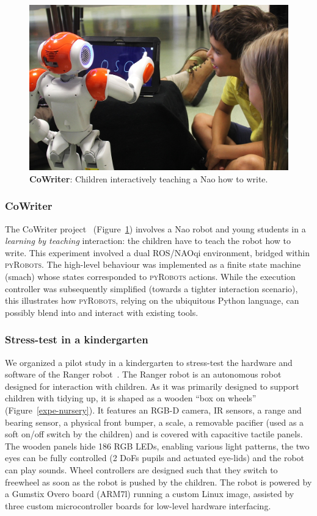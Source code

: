 \documentclass[letterpaper, 10pt, conference]{ieeeconf}      %
\newcommand{\pyRobots}{\textsc{pyRobots}}
\begin{document}
\begin{figure}
        \centering
        \includegraphics[width=0.9\columnwidth]{cowriter}
        \caption{\textbf{CoWriter}: Children interactively teaching a Nao how to
        write.}
        \label{expe-cowriter}
\end{figure}

\subsubsection{CoWriter} The {\sc CoWriter} project~\cite{hood2015when}
(Figure~\ref{expe-cowriter}) involves a Nao robot and young students
in a \emph{learning by teaching} interaction: the children have to teach the
robot how to write. This experiment involved a dual ROS/NAOqi environment,
bridged within \pyRobots{}. The high-level behaviour was implemented as a finite
state machine ({\sc smach}) whose states corresponded to \pyRobots{} actions.
While the execution controller was subsequently simplified (towards a tighter
interaction scenario), this illustrates how \pyRobots{}, relying on the
ubiquitous Python language, can possibly blend into and interact with existing
tools.

\subsubsection{Stress-test in a kindergarten}
\label{croq}

We organized a pilot study in a kindergarten to stress-test the hardware and
software of the Ranger robot~\cite{mondada2014ranger}. The Ranger robot is an
autonomous robot designed for interaction with children. As it was primarily
designed to support children with tidying up, it is shaped as a wooden ``box on
wheels'' (Figure~\ref{expe-nursery}). It features an RGB-D camera, IR sensors, a
range and bearing sensor, a physical front bumper, a scale, a removable pacifier
(used as a soft on/off switch by the children) and is covered with capacitive
tactile panels. The wooden panels hide 186 RGB LEDs, enabling various light
patterns, the two eyes can be fully controlled (2 DoFs pupils and actuated
eye-lids) and the robot can play sounds. Wheel controllers are designed such
that they switch to freewheel as soon as the robot is pushed by the children.
The robot is powered by a Gumstix Overo board (ARM7l) running a custom Linux
image, assisted by three custom microcontroller boards for low-level hardware
interfacing.
\end{document}
